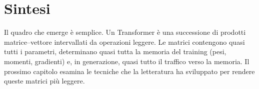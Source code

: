 \section{Sintesi}

Il quadro che emerge è semplice. Un Transformer è una successione di prodotti matrice--vettore intervallati da operazioni leggere. Le matrici contengono quasi tutti i parametri, determinano quasi tutta la memoria del training (pesi, momenti, gradienti) e, in generazione, quasi tutto il traffico verso la memoria. Il prossimo capitolo esamina le tecniche che la letteratura ha sviluppato per rendere queste matrici più leggere.
